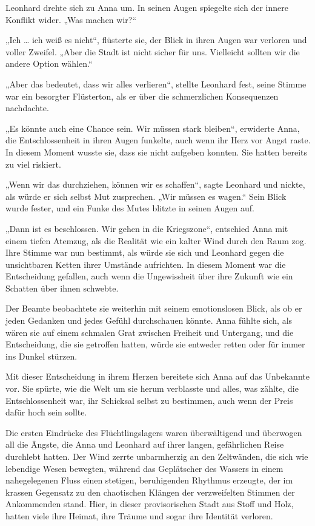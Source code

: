 \documentclass[
]{article}
\begin{document}
Leonhard drehte sich zu Anna um. In seinen Augen spiegelte sich der
innere Konflikt wider. „Was machen wir?{\kern0pt}``

„Ich \ldots{} ich weiß es nicht``, flüsterte sie, der Blick in ihren
Augen war verloren und voller Zweifel. „Aber die Stadt ist nicht sicher
für uns. Vielleicht sollten wir die andere Option wählen.``

„Aber das bedeutet, dass wir alles verlieren``, stellte Leonhard fest,
seine Stimme war ein besorgter Flüsterton, als er über die schmerzlichen
Konsequenzen nachdachte.

„Es könnte auch eine Chance sein. Wir müssen stark bleiben``, erwiderte
Anna, die Entschlossenheit in ihren Augen funkelte, auch wenn ihr Herz
vor Angst raste. In diesem Moment wusste sie, dass sie nicht aufgeben
konnten. Sie hatten bereits zu viel riskiert.

„Wenn wir das durchziehen, können wir es schaffen``, sagte Leonhard und
nickte, als würde er sich selbst Mut zusprechen. „Wir müssen es wagen.``
Sein Blick wurde fester, und ein Funke des Mutes blitzte in seinen Augen
auf.

„Dann ist es beschlossen. Wir gehen in die Kriegszone``, entschied Anna
mit einem tiefen Atemzug, als die Realität wie ein kalter Wind durch den
Raum zog. Ihre Stimme war nun bestimmt, als würde sie sich und Leonhard
gegen die unsichtbaren Ketten ihrer Umstände aufrichten. In diesem
Moment war die Entscheidung gefallen, auch wenn die Ungewissheit über
ihre Zukunft wie ein Schatten über ihnen schwebte.

Der Beamte beobachtete sie weiterhin mit seinem emotionslosen Blick, als
ob er jeden Gedanken und jedes Gefühl durchschauen könnte. Anna fühlte
sich, als wären sie auf einem schmalen Grat zwischen Freiheit und
Untergang, und die Entscheidung, die sie getroffen hatten, würde sie
entweder retten oder für immer ins Dunkel stürzen.

Mit dieser Entscheidung in ihrem Herzen bereitete sich Anna auf das
Unbekannte vor. Sie spürte, wie die Welt um sie herum verblasste und
alles, was zählte, die Entschlossenheit war, ihr Schicksal selbst zu
bestimmen, auch wenn der Preis dafür hoch sein sollte.

Die ersten Eindrücke des Flüchtlingslagers waren überwältigend und
überwogen all die Ängste, die Anna und Leonhard auf ihrer langen,
gefährlichen Reise durchlebt hatten. Der Wind zerrte unbarmherzig an den
Zeltwänden, die sich wie lebendige Wesen bewegten, während das
Geplätscher des Wassers in einem nahegelegenen Fluss einen stetigen,
beruhigenden Rhythmus erzeugte, der im krassen Gegensatz zu den
chaotischen Klängen der verzweifelten Stimmen der Ankommenden stand.
Hier, in dieser provisorischen Stadt aus Stoff und Holz, hatten viele
ihre Heimat, ihre Träume und sogar ihre Identität verloren.
\end{document}
